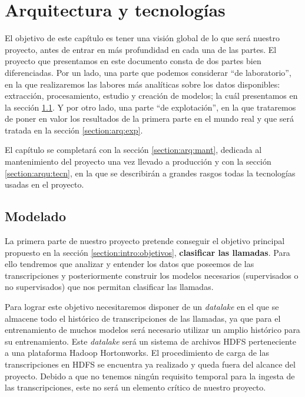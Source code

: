\chapter{Arquitectura y tecnologías}
\label{chapter:arquitectura}

El objetivo de este capítulo es tener una visión global de lo que será nuestro proyecto, antes de entrar en más profundidad en cada una de las partes. El proyecto que presentamos en este documento consta de dos partes bien diferenciadas. Por un lado, una parte que podemos considerar ``de laboratorio'', en la que realizaremos las labores más analíticas sobre los datos disponibles: extracción, procesamiento, estudio y creación de modelos; la cuál presentamos en la sección \ref{section:arq:mod}. Y por otro lado, una parte ``de explotación'', en la que trataremos de poner en valor los resultados de la primera parte en el mundo real y que será tratada en la sección \ref{section:arq:exp}. 


El capítulo se completará con la sección \ref{section:arq:mant}, dedicada al mantenimiento del proyecto una vez llevado a producción y con la sección \ref{section:arqu:tecn}, en la que se describirán a grandes rasgos todas la tecnologías usadas en el proyecto.





\section{Modelado}
\label{section:arq:mod}
La primera parte de nuestro proyecto pretende conseguir el objetivo principal propuesto en  la sección \ref{section:intro:objetivos}, \textbf{clasificar las llamadas}. Para ello tendremos que analizar y entender los datos que poseemos de las transcripciones y posteriormente construir los modelos necesarios (supervisados o no supervisados) que nos permitan clasificar las llamadas.

Para lograr este objetivo necesitaremos disponer de un \textit{datalake} en el que se almacene todo el histórico de transcripciones de las llamadas, ya que para el entrenamiento de muchos modelos será necesario utilizar un amplio histórico para su entrenamiento. Este \textit{datalake} será un sistema de archivos HDFS perteneciente a una plataforma Hadoop Hortonworks. El procedimiento de carga de las transcripciones en HDFS se encuentra ya realizado y queda fuera del alcance del proyecto. Debido a que no tenemos ningún requisito temporal para la ingesta de las transcripciones, este no será un elemento crítico de nuestro proyecto. 

